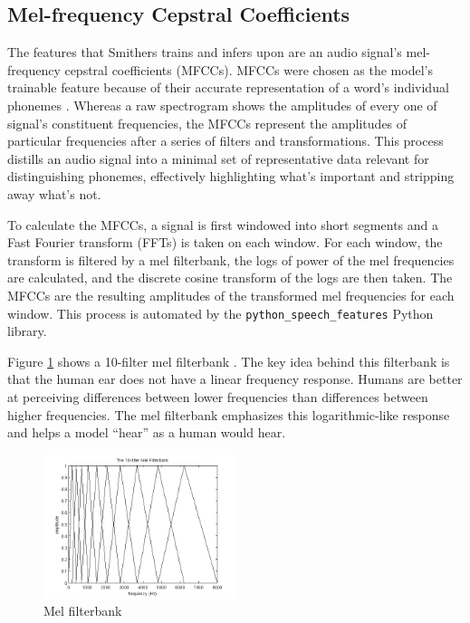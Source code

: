 \documentclass[conference]{IEEEtran}
\newcommand{\code}[1]{\texttt{#1}}
\begin{document}
\subsection{Mel-frequency Cepstral Coefficients} \label{sec:mfcc}
The features that Smithers trains and infers upon 
are an audio signal's mel-frequency cepstral coefficients (MFCCs).
MFCCs were chosen as the model's trainable feature because of their accurate representation
of a word's individual phonemes \cite{lyons}.
Whereas a raw spectrogram shows the amplitudes of every one of signal's constituent frequencies,
the MFCCs represent the amplitudes of particular frequencies after a series of filters and transformations.
This process distills an audio signal into a minimal set of representative data relevant for distinguishing phonemes, 
effectively highlighting what's important and stripping away what's not.

To calculate the MFCCs, a signal is first windowed into short segments
and a Fast Fourier transform (FFTs) is taken on each window.
For each window, the transform is filtered by a mel filterbank,
the logs of power of the mel frequencies are calculated,
and the discrete cosine transform of the logs are then taken.
The MFCCs are the resulting amplitudes of the transformed mel frequencies for each window.
This process is automated by the \code{python\_speech\_features} Python library.

Figure \ref{fig:filterbank} shows a 10-filter mel filterbank \cite{lyons}.
The key idea behind this filterbank is that the human ear does not have a linear frequency response.
Humans are better at perceiving differences between lower frequencies
than differences between higher frequencies.
The mel filterbank emphasizes this logarithmic-like response and helps a model ``hear'' as a human would hear.

\begin{figure}[htbp]
    \centerline{\includegraphics[width=0.5\textwidth]{figs/filterbank.png}}
    \caption{Mel filterbank \cite{lyons}}
    \label{fig:filterbank}
\end{figure}
\end{document}
